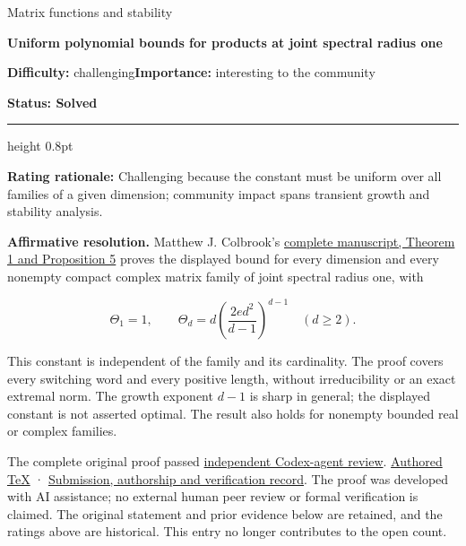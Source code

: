 \documentclass[11pt,a4paper]{article}
\makeatletter
\renewcommand{\subsection}{\Needspace{4\baselineskip}\@startsection{subsection}{2}{0pt}{9pt plus 1pt minus 1pt}{3pt}{\sffamily\bfseries\normalsize\color{ink}}}
\makeatother
\begin{document}
{\sffamily\small\color{muted}Matrix functions and stability\par}
\vspace{3pt}
{\raggedright{}\sffamily\bfseries\fontsize{21}{24}\selectfont\color{ink}Uniform
polynomial bounds for products at joint spectral radius one\par}
\vspace{7pt}
{\sffamily\small\textbf{Difficulty:} challenging\quad\textbf{Importance:} interesting
to the community\par}
{\sffamily\small\bfseries\color{accent}Status: Solved\par}
\vspace{4pt}
{\color{accent}\hrule height 0.8pt}
\vspace{6pt}
\textbf{Rating rationale:} Challenging because the constant must be
uniform over all families of a given dimension; community impact spans
transient growth and stability analysis.

\subsection{Resolution --- 2026-09-11}\label{resolution-2026-09-11}

\textbf{Affirmative resolution.} Matthew J. Colbrook's
\href{https://github.com/ajt60gaibb/OpenProblemsInNLA/blob/main/references/colbrook-jsr-growth-2026-09-11/manuscripts/uniform_growth_and_holder.pdf}{complete
manuscript, Theorem 1 and Proposition 5} proves the displayed bound for
every dimension and every nonempty compact complex matrix family of
joint spectral radius one, with

\[
\Theta_1=1,\qquad
\Theta_d=d\left(\frac{2ed^2}{d-1}\right)^{d-1}\quad(d\ge2).
\]

This constant is independent of the family and its cardinality. The
proof covers every switching word and every positive length, without
irreducibility or an exact extremal norm. The growth exponent \(d-1\) is
sharp in general; the displayed constant is not asserted optimal. The
result also holds for nonempty bounded real or complex families.

The complete original proof passed
\href{https://github.com/ajt60gaibb/OpenProblemsInNLA/blob/main/references/colbrook-jsr-growth-2026-09-11/verification/reviews/MF-05-MF-07-review.md}{independent
Codex-agent review}.
\href{https://github.com/ajt60gaibb/OpenProblemsInNLA/blob/main/references/colbrook-jsr-growth-2026-09-11/manuscripts/uniform_growth_and_holder.tex}{Authored
TeX} ·
\href{https://github.com/ajt60gaibb/OpenProblemsInNLA/blob/main/references/colbrook-jsr-growth-2026-09-11/README.md}{Submission,
authorship and verification record}. The proof was developed with AI
assistance; no external human peer review or formal verification is
claimed. The original statement and prior evidence below are retained,
and the ratings above are historical. This entry no longer contributes
to the open count.
\end{document}
